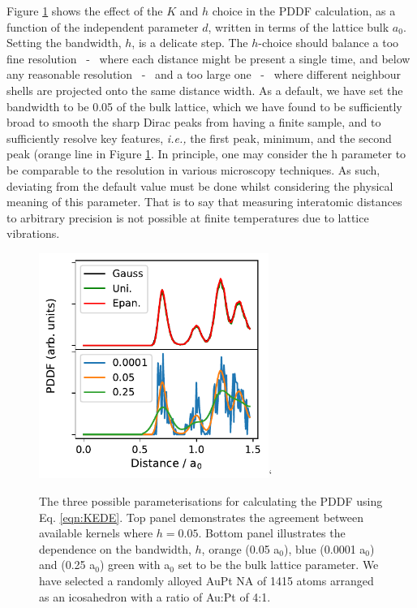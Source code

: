 Figure \ref{fig:pddf_params} shows the effect of the $K$ and $h$ choice in the PDDF calculation, as a function of the independent parameter $d$, written in terms of the lattice bulk $a_0$. 
Setting the bandwidth, $h$, is a delicate step. The $h$-choice should balance a too fine resolution ~-~ where each distance might be present a single time, and below any reasonable resolution ~-~ and a too large one ~-~ where different neighbour shells are projected onto the same distance width. 
%
As a default, we have set the bandwidth to be 0.05 of the bulk lattice, which we have found to be sufficiently broad to smooth the sharp Dirac peaks from having a finite sample, and to sufficiently resolve key features, \textit{i.e.,} the first peak, minimum, and the second peak (orange line in Figure \ref{fig:pddf_params}. In principle, one may consider the h parameter to be comparable to the resolution in various microscopy techniques. As such, deviating from the default value must be done whilst considering the physical meaning of this parameter. That is to say that measuring interatomic distances to arbitrary precision is not possible at finite temperatures due to lattice vibrations.
%
\begin{figure}[ht!]
    \centering
    \includegraphics[width=7.5cm]{figures/Sapphire/PDF_Example.pdf}`
    \caption{The three possible parameterisations for calculating the PDDF using Eq. \ref{eqn:KEDE}. Top panel demonstrates the agreement between available kernels where $h=0.05$. Bottom panel illustrates the dependence on the bandwidth, $h$, orange (0.05 a$_{0}$), blue (0.0001 a$_{0}$) and (0.25 a$_0$) green with a$_{0}$ set to be the bulk lattice parameter. We have selected a randomly alloyed AuPt NA of 1415 atoms arranged as an icosahedron with a ratio of Au:Pt of 4:1.}
    \label{fig:pddf_params}
\end{figure}

